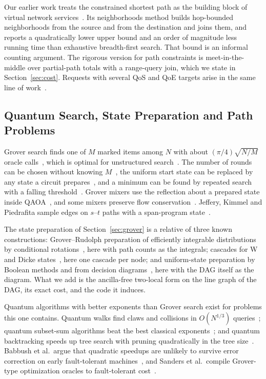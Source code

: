 \documentclass[journal]{IEEEtran}
\begin{document}
Our earlier work treats the constrained shortest path as the building block of virtual network services~\cite{chemodanov2016,chemodanov2019}. Its neighborhoods method builds hop-bounded neighborhoods from the source and from the destination and joins them, and reports a quadratically lower upper bound and an order of magnitude less running time than exhaustive breadth-first search. That bound is an informal counting argument. The rigorous version for path constraints is meet-in-the-middle over partial-path totals with a range-query join, which we state in Section~\ref{sec:cost}. Requests with several QoS and QoE targets arise in the same line of work~\cite{chemodanov2021,chemodanov2019infocom,chemodanov2020}.

\subsection{Quantum Search, State Preparation and Path Problems}

Grover search finds one of $M$ marked items among $N$ with about $(\pi/4)\sqrt{N/M}$ oracle calls~\cite{grover1996,boyer1998}, which is optimal for unstructured search~\cite{bennett1997}. The number of rounds can be chosen without knowing $M$~\cite{boyer1998}, the uniform start state can be replaced by any state a circuit prepares~\cite{brassard2002}, and a minimum can be found by repeated search with a falling threshold~\cite{durr1996}. Grover mixers use the reflection about a prepared state inside QAOA~\cite{baertschi2020}, and some mixers preserve flow conservation~\cite{zhang2021}. Jeffery, Kimmel and Piedrafita sample edges on $s$--$t$ paths with a span-program state~\cite{jeffery2023}.

The state preparation of Section~\ref{sec:grover} is a relative of three known constructions: Grover--Rudolph preparation of efficiently integrable distributions by conditional rotations~\cite{grover2002}, here with path counts as the integrals; cascades for W and Dicke states~\cite{baertschi2019dicke}, here one cascade per node; and uniform-state preparation by Boolean methods and from decision diagrams~\cite{mozafari2021,mozafari2022}, here with the DAG itself as the diagram. What we add is the ancilla-free two-local form on the line graph of the DAG, its exact cost, and the code it induces.

Quantum algorithms with better exponents than Grover search exist for problems this one contains. Quantum walks find claws and collisions in $O(N^{1/3})$ queries~\cite{ambainis2007,tani2009}; quantum subset-sum algorithms beat the best classical exponents~\cite{bonnetain2020}; and quantum backtracking speeds up tree search with pruning quadratically in the tree size~\cite{montanaro2018}. Babbush et al.\ argue that quadratic speedups are unlikely to survive error correction on early fault-tolerant machines~\cite{babbush2021}, and Sanders et al.\ compile Grover-type optimization oracles to fault-tolerant cost~\cite{sanders2020}.
\end{document}
